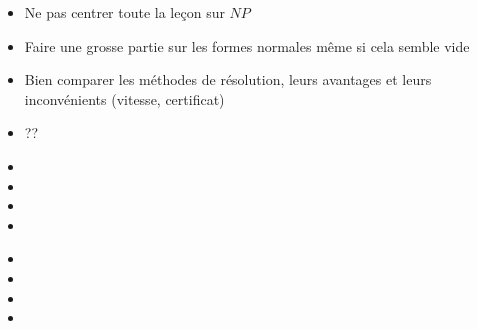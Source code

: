 \documentclass{agregfiche}
\begin{document}
\secpieges

\begin{itemize}
    \item Ne pas centrer toute la leçon sur $NP$
    \item Faire une grosse partie sur les formes normales même si cela semble
        vide
    \item Bien comparer les méthodes de résolution, leurs avantages et leurs
        inconvénients (vitesse, certificat)
\end{itemize}


\secquestionsclassiques

\begin{itemize}
    \item ??
\end{itemize}

\secreferences

\begin{itemize}
    \item {}
    \item {}
    \item {}
    \item {} 
\end{itemize}

\secdev

\begin{itemize}
    \item {}
    \item {}
    \item {}
    \item {}
\end{itemize}
\end{document}
